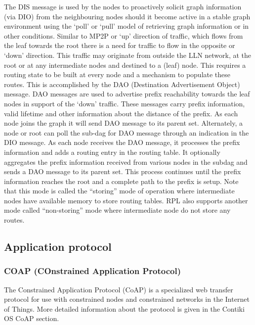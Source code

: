 The DIS message is used by the nodes to proactively solicit graph information (via DIO) from the neighbouring nodes should it become active in a stable graph environment using the ‘poll’ or ‘pull’ model of retrieving graph information or in other conditions.
Similar to MP2P or ‘up’ direction of traffic,
	which flows from the leaf towards the root there is a need for traffic to flow in the opposite or ‘down’ direction.
This traffic may originate from outside the LLN network,
	at the root or at any intermediate nodes and destined to a (leaf) node.
This requires a routing state to be built at every node and a mechanism to populate these routes.
This is accomplished by the DAO (Destination Advertisement Object) message.
DAO messages are used to advertise prefix reachability towards the leaf nodes in support of the ‘down’ traffic.
These messages carry prefix information,
	valid lifetime and other information about the distance of the prefix.
As each node joins the graph it will send DAO message to its parent set.
Alternately,
	a node or root can poll the sub-dag for DAO message through an indication in the DIO message.
As each node receives the DAO message,
	it processes the prefix information and adds a routing entry in the routing table.
It optionally aggregates the prefix information received from various nodes in the subdag and sends a DAO message to its parent set.
This process continues until the prefix information reaches the root and a complete path to the prefix is setup.
Note that this mode is called the “storing” mode of operation where intermediate nodes have available memory to store routing tables.
RPL also supports another mode called “non-storing” mode where intermediate node do not store any routes.


\subsection{Application protocol}

\subsubsection{COAP (COnstrained Application Protocol)}

The Constrained Application Protocol (CoAP) is a specialized web transfer protocol for use with constrained nodes and constrained networks in the Internet of Things.
More detailed information about the protocol is given in the Contiki OS CoAP section.

